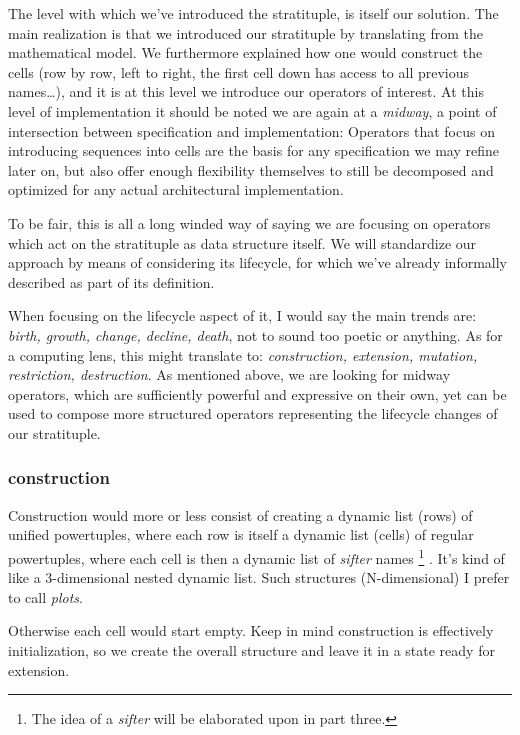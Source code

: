 \documentclass[twoside]{article}
\begin{document}
The level with which we've introduced the stratituple, is itself our solution. The main realization is that we introduced
our stratituple by translating from the mathematical model. We furthermore explained how one would construct the cells
(row by row, left to right, the first cell down has access to all previous names\ldots), and it is at this level we introduce
our operators of interest. At this level of implementation it should be noted we are again at a \emph{midway}, a point of
intersection between specification and implementation: Operators that focus on introducing sequences into cells are the basis
for any specification we may refine later on, but also offer enough flexibility themselves to still be decomposed and optimized
for any actual architectural implementation.

To be fair, this is all a long winded way of saying we are focusing on operators which act on the stratituple as data structure
itself. We will standardize our approach by means of considering its lifecycle, for which we've already informally described
as part of its definition.

When focusing on the lifecycle aspect of it, I would say the main trends are: \emph{birth, growth, change, decline, death},
not to sound too poetic or anything. As for a computing lens, this might translate to: \emph{construction, extension, mutation,
restriction, destruction}. As mentioned above, we are looking for midway operators, which are sufficiently powerful and expressive
on their own, yet can be used to compose more structured operators representing the lifecycle changes of our stratituple.

\subsubsection*{construction}

Construction would more or less consist of creating a dynamic list (rows) of unified powertuples, where each row
is itself a dynamic list (cells) of regular powertuples, where each cell is then a dynamic list of \emph{sifter} names
\footnote{The idea of a \emph{sifter} will be elaborated upon in part three.} . It's kind of like a 3-dimensional
nested dynamic list. Such structures (N-dimensional) I prefer to call \emph{plots}.

Otherwise each cell would start empty. Keep in mind construction is effectively initialization, so we create
the overall structure and leave it in a state ready for extension.
\end{document}

